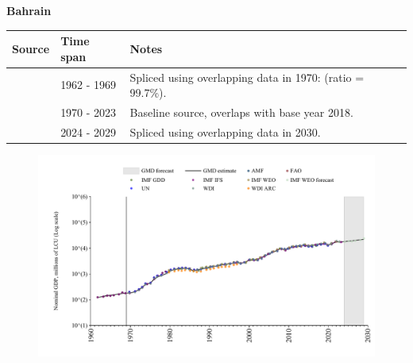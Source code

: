 \documentclass[12pt,a4paper,landscape]{article}
\begin{document}
\begin{adjustbox}{max totalsize={\paperwidth}{\paperheight},center}
\begin{minipage}[t][\textheight][t]{\textwidth}
\vspace*{0.5cm}
{}
\begin{center}
{\Large\bfseries Bahrain}
\end{center}
\vspace{0.5cm}
\begin{table}[H]
\centering
\small
\begin{tabular}{|l|l|l|}
\hline
\textbf{Source} & \textbf{Time span} & \textbf{Notes} \\
\hline
\rowcolor{white}\cite{IMF_IFS}& 1962 - 1969 &Spliced using overlapping data in 1970: (ratio = 99.7\%).\\
\rowcolor{lightgray}\cite{WDI}& 1970 - 2023 &Baseline source, overlaps with base year 2018.\\
\rowcolor{white}\cite{IMF_WEO_forecast}& 2024 - 2029 &Spliced using overlapping data in 2030.\\
\hline
\end{tabular}
\end{table}
\begin{figure}[H]
\centering
\includegraphics[width=\textwidth,height=0.6\textheight,keepaspectratio]{graphs/BHR_nGDP.pdf}
\end{figure}
\end{minipage}
\end{adjustbox}
\end{document}
